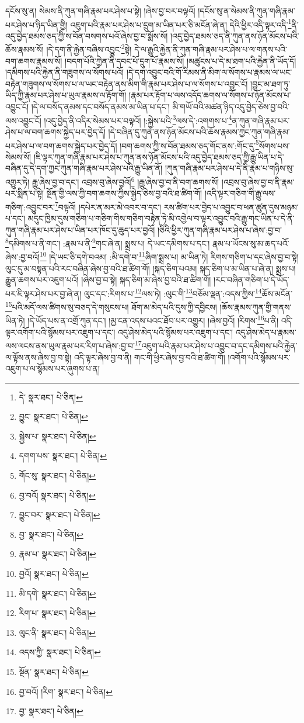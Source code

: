 དངོས་སུ་ན། སེམས་ནི་ཀུན་གཞི་རྣམ་པར་ཤེས་པ་སྟེ། །ཞེས་བྱ་བར་བལྟའོ། །དངོས་སུ་ན་སེམས་ནི་ཀུན་གཞི་རྣམ་པར་ཤེས་པ་ཉིད་ཡིན་གྱི། འཇུག་པའི་རྣམ་པར་ཤེས་པ་དྲུག་མ་ཡིན་པར་ཅི་མངོན་ཞེ་ན། དེའི་ཕྱིར་འདི་ལྟར་འདི་\footnote{དེ་  སྣར་ཐང་།  པེ་ཅིན། }ནི་འདུ་བྱེད་ཐམས་ཅད་ཀྱི་ས་བོན་བསགས་པའོ་ཞེས་བྱ་བ་སྨོས་སོ། །འདུ་བྱེད་ཐམས་ཅད་ནི་ཀུན་ནས་ཉོན་མོངས་པའི་ཆོས་རྣམས་སོ། །དེ་དག་ནི་རྐྱེན་བཞིས་འབྱུང་\footnote{བྱུང་  སྣར་ཐང་།  པེ་ཅིན། }སྟེ། དེ་ལ་རྒྱུའི་རྐྱེན་ནི་ཀུན་གཞི་རྣམ་པར་ཤེས་པ་ལ་གནས་པའི་བག་ཆགས་རྣམས་སོ། །བདག་པོའི་ཀྱེན་ནི་དབང་པོ་དྲུག་པོ་རྣམས་སོ། །མཚུངས་པ་དེ་མ་ཐག་པའི་རྐྱེན་ནི་ཡོད་དོ། །དམིགས་པའི་རྐྱེན་ནི་གཟུགས་ལ་སོགས་པའོ། །དེ་དག་འབྱུང་བའི་གོ་རིམས་ནི་མིག་ལ་སོགས་པ་རྣམས་ལ་ཡང་བརྟེན་གཟུགས་ལ་སོགས་པ་ལ་ཡང་བརྟེན་ནས་མིག་གི་རྣམ་པར་ཤེས་པ་ལ་སོགས་པ་འབྱུང་ངོ། །བྱུང་མ་ཐག་ཏུ་ཡིད་ཀྱི་རྣམ་པར་ཤེས་པ་ཡུལ་རྣམས་ལ་རྟོག་གོ། །རྣམ་པར་རྟོག་པ་ལས་འདོད་ཆགས་ལ་སོགས་པ་ཉོན་མོངས་པ་འབྱུང་ངོ། །དེ་ལ་བསོད་ནམས་དང་བསོད་ནམས་མ་ཡིན་པ་དང་། མི་གཡོ་བའི་མཚན་ཉིད་འདུ་བྱེད་ཅེས་བྱ་བའི་ལས་འབྱུང་ངོ། །འདུ་བྱེད་ནི་འདིར་སེམས་པར་བལྟའོ། །:སྐྱེས་པའི་\footnote{སྐྱེས་པ་  སྣར་ཐང་།  པེ་ཅིན། }ལས་དེ་:འགགས་པ་\footnote{དགག་པས་  སྣར་ཐང་།  པེ་ཅིན། }ན་ཀུན་གཞི་རྣམ་པར་ཤེས་པ་ལ་བག་ཆགས་སྐྱེད་པར་བྱེད་དོ། །དེ་བཞིན་དུ་ཀུན་ནས་ཉོན་མོངས་པའི་ཆོས་རྣམས་ཀྱང་ཀུན་གཞི་རྣམ་པར་ཤེས་པ་ལ་བག་ཆགས་སྐྱེད་པར་བྱེད་དོ། །བག་ཆགས་ཀྱི་ས་བོན་ཐམས་ཅད་གོང་ནས་:གོང་དུ་\footnote{གོང་སུ་  སྣར་ཐང་།  པེ་ཅིན། }སོགས་པས་སེམས་སོ། །ཇི་ལྟར་ཀུན་གཞི་རྣམ་པར་ཤེས་པ་ཀུན་ནས་ཉོན་མོངས་པའི་འདུ་བྱེད་ཐམས་ཅད་ཀྱི་རྒྱུ་ཡིན་པ་དེ་བཞིན་དུ་དེ་དག་ཀྱང་ཀུན་གཞི་རྣམ་པར་ཤེས་པའི་རྒྱུ་ཡིན་ནོ། །ཀུན་གཞི་རྣམ་པར་ཤེས་པ་དེ་ནི་རྣམ་པ་གཉིས་སུ་འགྱུར་ཏེ། རྒྱུ་ཞེས་བྱ་བ་དང་། འབྲས་བུ་ཞེས་བྱའོ།\footnote{བྱ་བའོ།  སྣར་ཐང་།  པེ་ཅིན། } །རྒྱུ་ཞེས་བྱ་བ་ནི་བག་ཆགས་སོ། །འབྲས་བུ་ཞེས་བྱ་བ་ནི་རྣམ་པར་སྨིན་པ་སྟེ། སྔོན་གྱི་ལས་ཀྱི་བག་ཆགས་ཀྱིས་སྐྱེད་ཅེས་བྱ་བའི་ཐ་ཚིག་གོ། །འདི་ལྟར་གཅིག་གི་རྒྱུ་ལས་གཅིག་:འབྱུང་བར་\footnote{བྱུང་བར་  སྣར་ཐང་།  པེ་ཅིན། }བལྟའོ། །དཔེར་ན་མར་མེ་འབར་བ་དང་། རས་ཚིག་པར་བྱེད་པ་འབྱུང་བ་ཕན་ཚུན་དུས་མཉམ་པ་དང་། མདུང་ཁྱིམ་དུས་གཅིག་པ་གཅིག་གིས་གཅིག་བརྟེན་ཏེ་མི་འགྱེལ་བ་ལྟར་འབྱུང་བའི་རྒྱུ་གང་ཡིན་པ་དེ་ནི་ཀུན་གཞི་རྣམ་པར་ཤེས་པ་ཡིན་པར་ཁོང་དུ་ཆུད་པར་བྱའོ། །ཅིའི་ཕྱིར་ཀུན་གཞི་རྣམ་པར་ཤེས་པ་ཞེས་:བྱ་བ་\footnote{བྱ་  སྣར་ཐང་།  པེ་ཅིན། }དམིགས་པ་ནི་གང་། :རྣམ་པ་ནི་\footnote{རྣམ་པ་  སྣར་ཐང་།  པེ་ཅིན། }གང་ཞེ་ན། སྨྲས་པ། དེ་ཡང་དམིགས་པ་དང་། རྣམ་པ་ཡོངས་སུ་མ་ཆད་པའོ་ཞེས་:བྱ་བའོ།\footnote{བྱའོ།  སྣར་ཐང་།  པེ་ཅིན། } །དེ་ཡང་ཅི་དགེ་བའམ། :མི་དགེ་བ་\footnote{མི་དགེ་  སྣར་ཐང་།  པེ་ཅིན། }ཞིག་སྨྲས་པ། མ་ཡིན་ཏེ། རིགས་གཅིག་པ་དང་ཞེས་བྱ་བ་སྟེ། ལུང་དུ་མ་བསྟན་པའི་རང་བཞིན་ཞེས་བྱ་བའི་ཐ་ཚིག་གོ། །སྐད་ཅིག་པའམ། སྐད་ཅིག་པ་མ་ཡིན་པ་ཞེ་ན། སྨྲས་པ། རྒྱུན་ཆགས་པར་འཇུག་པའོ། །ཞེས་བྱ་བ་སྟེ། སྐད་ཅིག་མ་ཞེས་བྱ་བའི་ཐ་ཚིག་གོ། །རང་བཞིན་གཅིག་པ་དེ་ཡོད་པར་ཇི་ལྟར་ཤེས་པར་བྱ་ཞེ་ན། ལུང་དང་:རིགས་པ་\footnote{རིག་པ་  སྣར་ཐང་།  པེ་ཅིན། }ལས་ཏེ། :ལུང་གི་\footnote{ལུང་ནི་  སྣར་ཐང་།  པེ་ཅིན། }བཅོམ་ལྡན་:འདས་ཀྱིས་\footnote{འདས་ཀྱི་  སྣར་ཐང་།  པེ་ཅིན། }ཆོས་མངོན་\footnote{སྔོན་  སྣར་ཐང་།  པེ་ཅིན། }པའི་མདོ་ལས་ཚིགས་སུ་བཅད་དེ་གསུངས་པ། ཐོག་མ་མེད་པའི་དུས་ཀྱི་དབྱིངས། །ཆོས་རྣམས་ཀུན་གྱི་གནས་ཡིན་ཏེ། །དེ་ཡོད་པས་ན་འགྲོ་ཀུན་དང་། །མྱ་ངན་འདས་པའང་ཐོབ་པར་འགྱུར། །ཞེས་བྱའོ། །རིགས་\footnote{བྱ་བའོ། །རིག་  སྣར་ཐང་།  པེ་ཅིན། }པ་ནི། འདི་ལྟར་འགོག་པའི་སྙོམས་པར་འཇུག་པ་དང་། འདུ་ཤེས་མེད་པའི་སྙོམས་པར་འཇུག་པ་དང་། འདུ་ཤེས་མེད་པ་རྣམས་ལས་ལངས་ནས་ཡུལ་རྣམ་པར་རིག་པ་ཞེས་:བྱ་བ་\footnote{བྱ་  སྣར་ཐང་།  པེ་ཅིན། }འཇུག་པའི་རྣམ་པར་ཤེས་པ་འབྱུང་བ་དང་དམིགས་པའི་རྐྱེན་ལ་ལྟོས་ནས་ཞེས་བྱ་བ་སྟེ། འདི་ལྟར་ཞེས་བྱ་བ་ནི། གང་གི་ཕྱིར་ཞེས་བྱ་བའི་ཐ་ཚིག་གོ། །འགོག་པའི་སྙོམས་པར་འཇུག་པ་ལ་སྙོམས་པར་ཞུགས་པ་ན། 